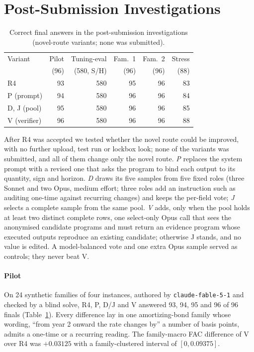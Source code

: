 \documentclass[conference]{IEEEtran}
\newcommand{\id}[1]{\texttt{#1}}
\begin{document}
\section{Post-Submission Investigations}\label{sec:post}
\begin{table}[t]
\caption{Correct final answers in the post-submission investigations (novel-route variants; none was submitted).}
\label{tab:post}
\centering
\scriptsize
\setlength{\tabcolsep}{4pt}
\begin{tabular}{@{}lrrrrr@{}}
\toprule
Variant & Pilot & Tuning-eval & Fam.\ 1 & Fam.\ 2 & Stress \\
 & (96) & (580, S/H) & (96) & (96) & (88) \\
\midrule
R4 & 93 & 580 & 95 & 96 & 83 \\
P (prompt) & 94 & 580 & 96 & 96 & 84 \\
D, J (pool) & 95 & 580 & 96 & 96 & 85 \\
V (verifier) & 96 & 580 & 96 & 96 & 88 \\
\bottomrule
\end{tabular}
\end{table}
After R4 was accepted we tested whether the novel route could be improved, with no further upload, test run or lockbox look; none of the variants was submitted, and all of them change only the novel route. \emph{P} replaces the system prompt with a revised one that asks the program to bind each output to its quantity, sign and horizon. \emph{D} draws its five samples from five fixed roles (three Sonnet and two Opus, medium effort; three roles add an instruction such as auditing one-time against recurring changes) and keeps the per-field vote; \emph{J} selects a complete sample from the same pool. \emph{V} adds, only when the pool holds at least two distinct complete rows, one select-only Opus call that sees the anonymised candidate programs and must return an evidence program whose executed outputs reproduce an existing candidate; otherwise J stands, and no value is edited. A model-balanced vote and one extra Opus sample served as controls; they never beat V.

\paragraph*{Pilot} On 24 synthetic families of four instances, authored by \id{claude-fable-5-1} and checked by a blind solve, R4, P, D/J and V answered 93, 94, 95 and 96 of 96 finals (Table~\ref{tab:post}). Every difference lay in one amortizing-bond family whose wording, ``from year 2 onward the rate changes by'' a number of basis points, admits a one-time or a recurring reading. The family-macro FAC difference of V over R4 was $+0.03125$ with a family-clustered interval of $[0,0.09375]$.
\end{document}
